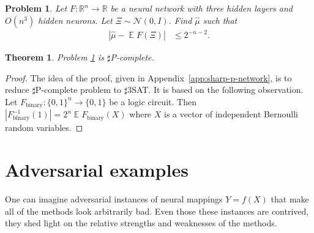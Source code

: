 \documentclass{article}
\newtheorem{theorem}{Theorem}
\newtheorem{problem}{Problem}
\DeclareMathOperator{\expect}{\mathbb{E}}
\begin{document}
\begin{problem}
\label{prob:sharp-p-network}
  Let \(F: \mathbb R^n \to \mathbb R\) be a neural network with three hidden layers and \(O(n^3)\) hidden neurons.
  Let \(\Xi \sim \mathcal N(0, I)\).
  Find \(\hat \mu\) such that
  \begin{align*}
    \left| \hat \mu - \expect F(\Xi) \right| &\leq 2^{-n - 2}.
  \end{align*}
\end{problem}

\begin{theorem}
  \label{thm:sharp-p-network}
  Problem \ref{prob:sharp-p-network} is \(\sharp\)P-complete.
\end{theorem}
\begin{proof}
  The idea of the proof, given in Appendix~\ref{app:sharp-p-network}, is to reduce \(\sharp\)P-complete problem to \(\sharp\)3SAT.
  It is based on the following observation.
  Let \(F_\text{binary}: \{0, 1\}^n \to \{0, 1\}\) be a logic circuit.
  Then \(|F_\text{binary}^{-1}(1)| = 2^n \expect F_\text{binary}(X)\) where \(X\) is a vector of independent Bernoulli random variables.
\end{proof}

\section{Adversarial examples}
\label{sec:adversariality}
One can imagine adversarial instances of neural mappings \(Y=f(X)\) that make all of the methods look arbitrarily bad.
Even those these instances are contrived, they shed light on the relative strengths and weaknesses of the methods.
\end{document}
